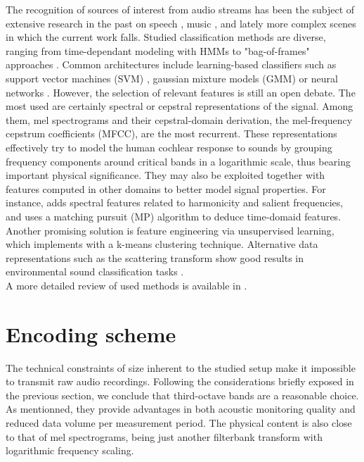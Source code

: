 \documentclass[final,3p,times,twocolumn]{elsarticle}
\begin{document}
The recognition of sources of interest from audio streams has been the subject of extensive research in the past on speech \cite{anusuya2009}, music \cite{tzanetakis2002}, and lately more complex scenes in which the current work falls. Studied classification methods are diverse, ranging from time-dependant modeling with HMMs \cite{ntalampiras2014} to "bag-of-frames" approaches \cite{aucouturier2007, foggia2015}. Common architectures include learning-based classifiers such as support vector machines (SVM) \cite{kumar2016}, gaussian mixture models (GMM) \cite{radhakrishnan2005} or neural networks \cite{salamon2017, piczak2015}. However, the selection of relevant features is still an open debate. The most used are certainly spectral \cite{khunarsal2013} or cepstral \cite{couvreur2004} representations of the signal. Among them, mel spectrograms and their cepstral-domain derivation, the mel-frequency cepstrum coefficients (MFCC), are the most recurrent. These representations effectively try to model the human cochlear response to sounds by grouping frequency components around critical bands in a logarithmic scale, thus bearing important physical significance. They may also be exploited together with features computed in other domains to better model signal properties. For instance, \cite{cai2006} adds spectral features related to harmonicity and salient frequencies, and \cite{chu2009} uses a matching pursuit (MP) algorithm to deduce time-domaid features. Another promising solution is feature engineering via unsupervised learning, which \cite{salamon2015-2} implements with a k-means clustering technique. Alternative data representations such as the scattering transform \cite{bauge2013} show good results in environmental sound classification tasks \cite{salamon2015}.\\
A more detailed review of used methods is available in \cite{chachada2013}.

\section{Encoding scheme} \label{sec:coder}

The technical constraints of size inherent to the studied setup make it impossible to transmit raw audio recordings. Following the considerations briefly exposed in the previous section, we conclude that third-octave bands are a reasonable choice. As mentionned, they provide advantages in both acoustic monitoring quality and reduced data volume per measurement period. The physical content is also close to that of mel spectrograms, being just another filterbank transform with logarithmic frequency scaling.\\
\end{document}
